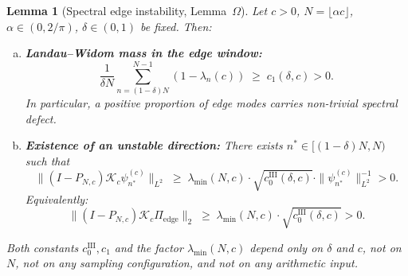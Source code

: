 \documentclass[12pt,a4paper]{amsart}
\newtheorem{lemma}[theorem]{Lemma}
\theoremstyle{definition}
\newcommand{\Kop}{\mathcal{K}_c}
\newcommand{\PN}{P_{N,c}}
\newcommand{\Pedge}{\Pi_{\mathrm{edge}}}
\newcommand{\lmin}{\lambda_{\min}(N,c)}
\begin{document}
\begin{lemma}[Spectral edge instability, Lemma~$\Omega$]%
\label{lem:omega}
Let $c > 0$, $N = \lfloor\alpha c\rfloor$,
$\alpha\in(0,2/\pi)$, $\delta\in(0,1)$ be fixed.
Then:
\begin{enumerate}[(a)]
\item \textbf{Landau--Widom mass in the edge window:}
\begin{equation}\label{eq:omega_lw}
  \frac{1}{\delta N}\sum_{n=(1-\delta)N}^{N-1}(1-\lambda_n(c))
  \;\ge\; c_1(\delta,c) > 0.
\end{equation}
In particular, a positive proportion of edge modes carries
non-trivial spectral defect.
\item \textbf{Existence of an unstable direction:}
There exists $n^* \in [(1-\delta)N, N)$ such that
\begin{equation}\label{eq:omega_nstar}
  \|(I-\PN)\Kop\psi_{n^*}^{(c)}\|_{L^2}
  \;\ge\; \lmin \cdot \sqrt{c_0^{\mathrm{III}}(\delta,c)}
  \cdot \|\psi_{n^*}^{(c)}\|_{L^2}^{-1} > 0.
\end{equation}
Equivalently:
\begin{equation}\label{eq:omega_op}
  \|(I-\PN)\Kop\Pedge\|_2
  \;\ge\; \lmin \cdot \sqrt{c_0^{\mathrm{III}}(\delta,c)} > 0.
\end{equation}
\end{enumerate}
Both constants $c_0^{\mathrm{III}}, c_1$ and the factor $\lmin$
depend only on $\delta$ and $c$,
not on $N$, not on any sampling configuration,
and not on any arithmetic input.
\end{lemma}
\end{document}

